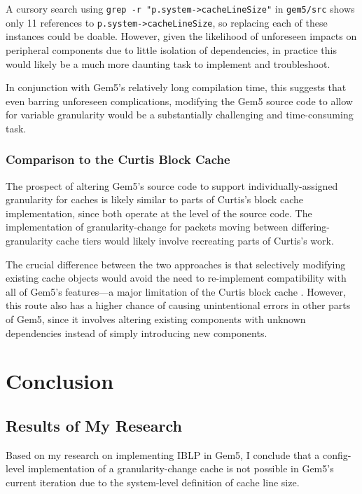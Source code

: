 \documentclass[12pt,twoside]{reedthesis}
\begin{document}
	A cursory search using \verb`grep -r "p.system->cacheLineSize"` in \verb`gem5/src` shows only 11 references to \verb`p.system->cacheLineSize`, so replacing each of these instances could be doable. However, given the likelihood of unforeseen impacts on peripheral components due to little isolation of dependencies, in practice this would likely be a much more daunting task to implement and troubleshoot.
	
	In conjunction with Gem5's relatively long compilation time, this suggests that even barring unforeseen complications, modifying the Gem5 source code to allow for variable granularity would be a substantially challenging and time-consuming task.

	\subsection*{Comparison to the Curtis Block Cache}

	The prospect of altering Gem5's source code to support individually-assigned granularity for caches is likely similar to parts of Curtis's block cache implementation, since both operate at the level of the source code. The implementation of granularity-change for packets moving between differing-granularity cache tiers would likely involve recreating parts of Curtis's work.
	
	The crucial difference between the two approaches is that selectively modifying existing cache objects would avoid the need to re-implement compatibility with all of Gem5's features---a major limitation of the Curtis block cache \cite{curtis}. However, this route also has a higher chance of causing unintentional errors in other parts of Gem5, since it involves altering existing components with unknown dependencies instead of simply introducing new components.

\chapter{Conclusion}

\section{Results of My Research}

	Based on my research on implementing IBLP in Gem5, I conclude that a config-level implementation of a granularity-change cache is not possible in Gem5's current iteration due to the system-level definition of cache line size.
\end{document}
